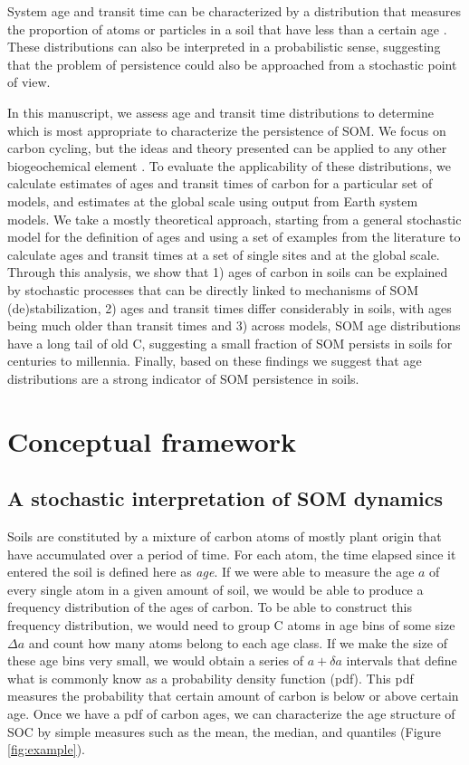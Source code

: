 \documentclass[draft,linenumbers]{agujournal}
\begin{document}
System age and transit time can be characterized by a distribution that measures the proportion of atoms or particles in a soil that have less than a certain age \citep{Eriksson1971, Bolin1973}. These distributions can also be interpreted in a probabilistic sense, suggesting that the problem of persistence could also be approached from a stochastic point of view. 

In this manuscript, we assess age and transit time distributions to determine which is most appropriate to characterize the persistence of SOM. We focus on carbon cycling, but the ideas and theory presented can be applied to any other biogeochemical element \citep{Spohn2018}. To evaluate the applicability of these distributions, we calculate estimates of ages and transit times of carbon for a particular set of models, and estimates at the global scale using output from Earth system models. We take a mostly theoretical approach, starting from a general stochastic model for the definition of ages and using a set of examples from the literature to calculate ages and transit times at a set of single sites and at the global scale. Through this analysis, we show that 1) ages of carbon in soils can be explained by stochastic processes that can be directly linked to mechanisms of SOM (de)stabilization, 2) ages and transit times differ considerably in soils, with ages being much older than transit times and 3) across models, SOM age distributions have a long tail of old C, suggesting a small fraction of SOM persists in soils for centuries to millennia. Finally, based on these findings we suggest that age distributions are a strong indicator of SOM persistence in soils. 

\section{Conceptual framework}

\subsection{A stochastic interpretation of SOM dynamics}
Soils are constituted by a mixture of carbon atoms of mostly plant origin that have accumulated over a period of time. 
For each atom, the time elapsed since it entered the soil is defined here as \emph{age}. If we were able to measure the age $a$ of every single atom in a given amount of soil, we would be able to produce a frequency distribution of the ages of carbon. To be able to construct this frequency distribution, we would need to group C atoms in age bins of some size $\Delta a$ and count how many atoms belong to each age class.  If we make the size of these age bins very small, we would obtain a series of $a + \delta a$ intervals that define what is commonly know as a probability density function (pdf). This pdf measures the probability that certain amount of carbon is below or above certain age. Once we have a pdf of carbon ages, we can characterize the age structure of SOC by simple measures such as the mean, the median, and quantiles (Figure \ref{fig:example}). 
\end{document}

